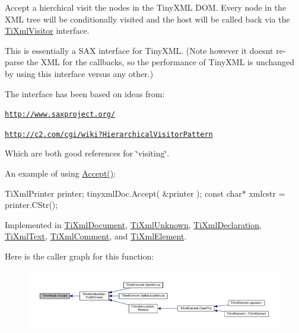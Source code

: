 Accept a hierchical visit the nodes in the Tiny\+X\+ML D\+OM. Every node in the X\+ML tree will be conditionally visited and the host will be called back via the \hyperlink{class_ti_xml_visitor}{Ti\+Xml\+Visitor} interface.

This is essentially a S\+AX interface for Tiny\+X\+ML. (Note however it doesn\textquotesingle{}t re-\/parse the X\+ML for the callbacks, so the performance of Tiny\+X\+ML is unchanged by using this interface versus any other.)

The interface has been based on ideas from\+:


\begin{DoxyItemize}
\item \href{http://www.saxproject.org/}{\tt http\+://www.\+saxproject.\+org/}
\item \href{http://c2.com/cgi/wiki?HierarchicalVisitorPattern}{\tt http\+://c2.\+com/cgi/wiki?\+Hierarchical\+Visitor\+Pattern}
\end{DoxyItemize}

Which are both good references for \char`\"{}visiting\char`\"{}.

An example of using \hyperlink{class_ti_xml_node_acc0f88b7462c6cb73809d410a4f5bb86}{Accept()}\+: \begin{DoxyVerb}TiXmlPrinter printer;
tinyxmlDoc.Accept( &printer );
const char* xmlcstr = printer.CStr();
\end{DoxyVerb}
 

Implemented in \hyperlink{class_ti_xml_document_a8ddd6eec722cbd25900bbac664909bac}{Ti\+Xml\+Document}, \hyperlink{class_ti_xml_unknown_aafdf1b2d4f561979c7907bad91004999}{Ti\+Xml\+Unknown}, \hyperlink{class_ti_xml_declaration_aa1b6bade6c989407ce9881bdfc73c1e6}{Ti\+Xml\+Declaration}, \hyperlink{class_ti_xml_text_af65964326eac4640bfb97d4622fa0de2}{Ti\+Xml\+Text}, \hyperlink{class_ti_xml_comment_ac894241530d1d266131a5026cb251a95}{Ti\+Xml\+Comment}, and \hyperlink{class_ti_xml_element_a01d33358cce9d1817b557d314dda3779}{Ti\+Xml\+Element}.

Here is the caller graph for this function\+:\nopagebreak
\begin{figure}[H]
\begin{center}
\leavevmode
\includegraphics[width=350pt]{class_ti_xml_node_acc0f88b7462c6cb73809d410a4f5bb86_icgraph}
\end{center}
\end{figure}
\mbox{\label{class_ti_xml_node_a708e7f953df61d4d2d12f73171550a4b}} 
